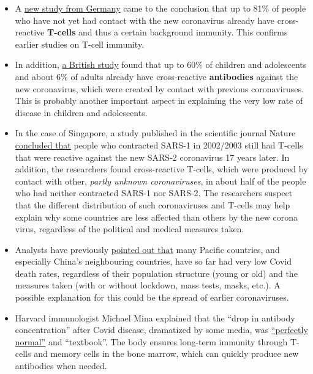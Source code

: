 \begin{itemize}
\tightlist
\item
  A \href{https://www.researchsquare.com/article/rs-35331/v1}{new study
  from Germany} came to the conclusion that up to 81\% of people who
  have not yet had contact with the new coronavirus already have
  cross-reactive \textbf{T-cells} and thus a certain background
  immunity. This confirms earlier studies on T-cell immunity.
\item
  In addition,
  \href{https://www.biorxiv.org/content/10.1101/2020.05.14.095414v2}{a
  British study} found that up to 60\% of children and adolescents and
  about 6\% of adults already have cross-reactive \textbf{antibodies}
  against the new coronavirus, which were created by contact with
  previous coronaviruses. This is probably another important aspect in
  explaining the very low rate of disease in children and adolescents.
\item
  In the case of Singapore, a study published in the scientific journal
  Nature
  \href{https://www.nature.com/articles/s41586-020-2550-z}{concluded
  that} people who contracted SARS-1 in 2002/2003 still had T-cells that
  were reactive against the new SARS-2 coronavirus 17 years later. In
  addition, the researchers found cross-reactive T-cells, which were
  produced by contact with other, \emph{partly unknown coronaviruses},
  in about half of the people who had neither contracted SARS-1 nor
  SARS-2. The researchers suspect that the different distribution of
  such coronaviruses and T-cells may help explain why some countries are
  less affected than others by the new corona virus, regardless of the
  political and medical measures taken.
\item
  Analysts have previously
  \href{https://twitter.com/boriquagato/status/1280212958392446977}{pointed
  out that} many Pacific countries, and especially China's neighbouring
  countries, have so far had very low Covid death rates, regardless of
  their population structure (young or old) and the measures taken (with
  or without lockdown, mass tests, masks, etc.). A possible explanation
  for this could be the spread of earlier coronaviruses.
\item
  Harvard immunologist Michael Mina explained that the ``drop in
  antibody concentration'' after Covid disease, dramatized by some
  media, was
  \href{https://www.nytimes.com/2020/07/22/health/covid-antibodies-herd-immunity.html}{``perfectly
  normal''} and ``textbook''. The body ensures long-term immunity
  through T-cells and memory cells in the bone marrow, which can quickly
  produce new antibodies when needed.
\end{itemize}

